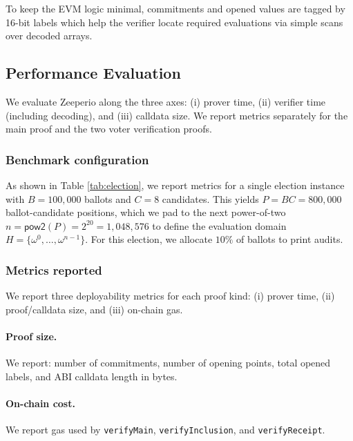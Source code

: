 To keep the EVM logic minimal, commitments and opened values are tagged by
16-bit labels which help the verifier locate required evaluations via simple scans over
decoded arrays.

\subsection{Performance Evaluation}

We evaluate Zeeperio along the three axes:
(i) prover time, (ii) verifier time (including decoding), and (iii) calldata size.
We report metrics separately for the main proof and the two voter verification proofs.


\subsubsection{Benchmark configuration}

As shown in Table \ref{tab:election}, we report metrics for a single election instance with
$B=100,000$ ballots and $C=8$ candidates. This yields $P=BC=800{,}000$
ballot-candidate positions, which we pad to the next power-of-two
$n=\textsf{pow2}(P)=2^{20}=1{,}048{,}576$ to define the evaluation domain
$H=\{\omega^0,\ldots,\omega^{n-1}\}$.
For this election, we allocate $10\%$ of ballots to print audits.



\subsubsection{Metrics reported}

We report three deployability metrics for each proof kind:
(i) prover time, (ii) proof/calldata size, and (iii) on-chain gas.


\paragraph{Proof size.}
We report: number of commitments, number of opening points, total opened labels,
and ABI calldata length in bytes.

\paragraph{On-chain cost.}
We report gas used by \texttt{verifyMain}, \texttt{verifyInclusion}, and
\texttt{verifyReceipt}.






